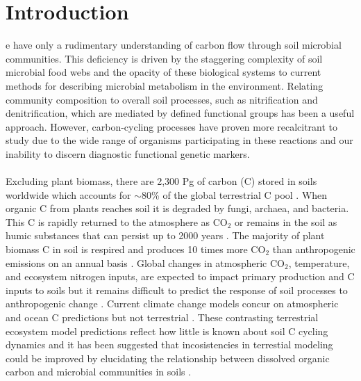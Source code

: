 \section{Introduction}
e have only a rudimentary understanding of carbon flow through soil
microbial communities. This deficiency is driven by the staggering complexity
of soil microbial food webs and the opacity of these biological systems to
current methods for describing microbial metabolism in the environment.
Relating community composition to overall soil processes, such as nitrification
and denitrification, which are mediated by defined functional groups has been a
useful approach. However, carbon-cycling processes have proven more
recalcitrant to study due to the wide range of organisms participating in these
reactions and our inability to discern diagnostic functional genetic markers.

\paragraph{}
Excluding plant biomass, there are 2,300 Pg of carbon (C) stored in soils
worldwide which accounts for $\sim$80\% of the global terrestrial C pool
\citep{Amundson_2001,BATJES_1996}. When organic C from plants reaches soil it
is degraded by fungi, archaea, and bacteria. This C is rapidly returned to the
atmosphere as CO$_{2}$ or remains in the soil as humic substances that can
persist up to 2000 years \citep{yanagita1990natural}. The majority of plant
biomass C in soil is respired and produces 10 times more CO$_{2}$ than
anthropogenic emissions on an annual basis \citep{chapin2002principles}. Global
changes in atmospheric CO$_{2}$, temperature, and ecosystem nitrogen inputs,
are expected to impact primary production and C inputs to soils
\citep{Groenigen_2006} but it remains difficult to predict the response of soil
processes to anthropogenic change \citep{DAVIDSON_2006}. Current climate change
models concur on atmospheric and ocean C predictions but not terrestrial
\citep{Friedlingstein_2006}. These contrasting terrestrial ecosystem model
predictions reflect how little is known about soil C cycling dynamics and it
has been suggested that incosistencies in terrestial modeling could be improved
by elucidating the relationship between dissolved organic carbon and microbial
communities in soils \citep{Neff_2001}. 

